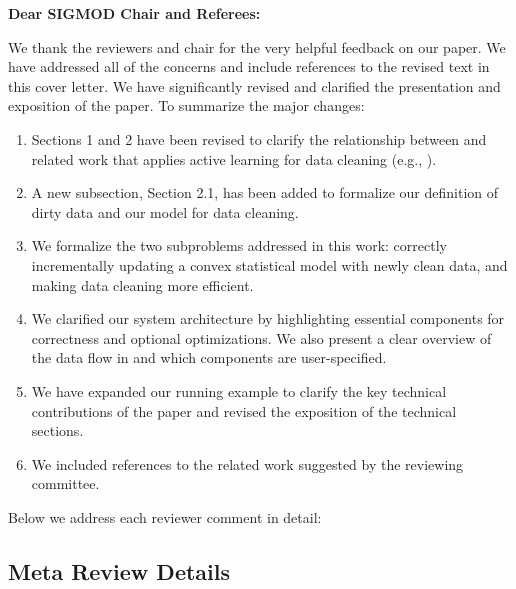 {\noindent \normalsize \bf Dear SIGMOD Chair and Referees: }

\vspace{.5em}

We thank the reviewers and chair for the very helpful feedback on our paper. We have addressed all of the concerns and include references to the revised text in this cover letter. 
We have significantly revised and clarified the presentation and exposition
of the paper.
To summarize the major changes:

\begin{enumerate}
\item Sections 1 and 2 have been revised to clarify the relationship between \sys and related work that applies active learning for data cleaning (e.g., \cite{gokhale2014corleone, DBLP:journals/pvldb/YakoutENOI11, yakout2013don}).

\item A new subsection, Section 2.1, has been added to formalize our definition of dirty data and our model for data cleaning.

\item We formalize the two subproblems addressed in this work: correctly incrementally updating a convex statistical model with newly clean data, and making data cleaning more efficient.

\item We clarified our system architecture by highlighting essential components for correctness and optional optimizations. We also present a clear overview of the data flow in \sys and which components are user-specified.

\item We have expanded our running example to clarify the key technical contributions of the paper and revised the exposition of the technical sections.

\item We included references to the related work suggested by the reviewing committee.
\end{enumerate}
Below we address each reviewer comment in detail:

\vspace{0.5em}

\subsection*{Meta Review Details} 


